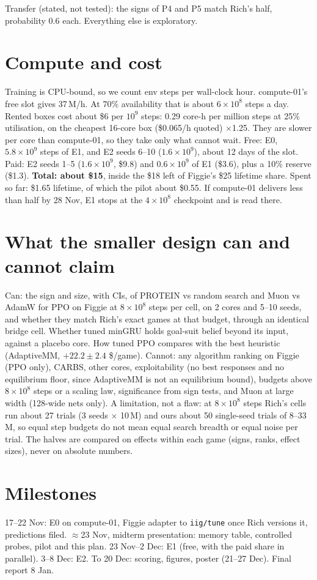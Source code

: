 \documentclass[10pt]{article}
\newcommand{\file}[1]{{\small\texttt{#1}}}
\begin{document}
Transfer (stated, not tested): the signs of P4 and P5 match Rich's half, probability 0.6 each. Everything else is exploratory.

\section{Compute and cost}
Training is CPU-bound, so we count env steps per wall-clock hour. compute-01's free slot gives 37\,M/h. At 70\% availability that is about $6\times10^8$ steps a day. Rented boxes cost about \$6 per $10^9$ steps: 0.29 core-h per million steps at 25\% utilisation, on the cheapest 16-core box (\$0.065/h quoted) $\times$1.25. They are slower per core than compute-01, so they take only what cannot wait. Free: E0, $5.8\times10^9$ steps of E1, and E2 seeds 6--10 ($1.6\times10^9$), about 12 days of the slot. Paid: E2 seeds 1--5 ($1.6\times10^9$, \$9.8) and $0.6\times10^9$ of E1 (\$3.6), plus a 10\% reserve (\$1.3). \textbf{Total: about \$15}, inside the \$18 left of Figgie's \$25 lifetime share. Spent so far: \$1.65 lifetime, of which the pilot about \$0.55. If compute-01 delivers less than half by 28 Nov, E1 stops at the $4\times10^8$ checkpoint and is read there.

\section{What the smaller design can and cannot claim}
Can: the sign and size, with CIs, of PROTEIN vs random search and Muon vs AdamW for PPO on Figgie at $8\times10^8$ steps per cell, on 2 cores and 5--10 seeds, and whether they match Rich's exact games at that budget, through an identical bridge cell. Whether tuned minGRU holds goal-suit belief beyond its input, against a placebo core. How tuned PPO compares with the best heuristic (AdaptiveMM, $+22.2\pm2.4$ \$/game).
Cannot: any algorithm ranking on Figgie (PPO only), CARBS, other cores, exploitability (no best responses and no equilibrium floor, since AdaptiveMM is not an equilibrium bound), budgets above $8\times10^8$ steps or a scaling law, significance from sign tests, and Muon at large width (128-wide nets only). A limitation, not a flaw: at $8\times10^8$ steps Rich's cells run about 27 trials (3 seeds $\times$ 10\,M) and ours about 50 single-seed trials of 8--33\,M, so equal step budgets do not mean equal search breadth or equal noise per trial. The halves are compared on effects within each game (signs, ranks, effect sizes), never on absolute numbers.

\section{Milestones}
17--22 Nov: E0 on compute-01, Figgie adapter to \file{iig/tune} once Rich versions it, predictions filed. $\approx$23 Nov, midterm presentation: memory table, controlled probes, pilot and this plan. 23 Nov--2 Dec: E1 (free, with the paid share in parallel). 3--8 Dec: E2. To 20 Dec: scoring, figures, poster (21--27 Dec). Final report 8 Jan.
\end{document}
